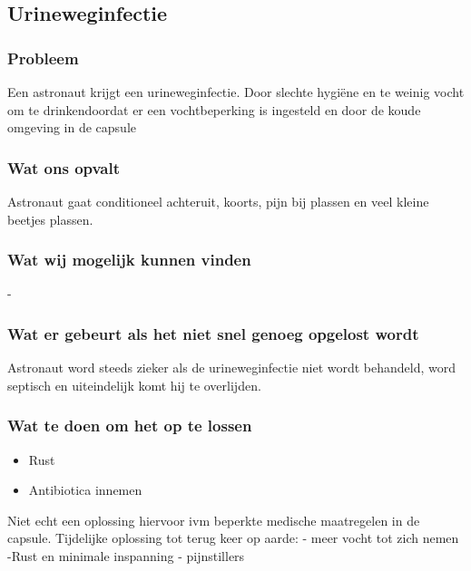 \subsection{Urineweginfectie}

\subsubsection{Probleem}
Een astronaut krijgt een urineweginfectie.
Door slechte hygiëne en te weinig vocht om te drinkendoordat er een vochtbeperking is ingesteld en door de koude omgeving in de capsule

\subsubsection{Wat ons opvalt}
Astronaut gaat conditioneel achteruit, koorts, pijn bij plassen en veel kleine beetjes plassen.

\subsubsection{Wat wij mogelijk kunnen vinden}
-

\subsubsection{Wat er gebeurt als het niet snel genoeg opgelost wordt}
Astronaut word steeds zieker als de urineweginfectie niet wordt behandeld, word septisch en uiteindelijk komt hij te overlijden.

\subsubsection{Wat te doen om het op te lossen}
\begin{itemize}
    \item Rust
    \item Antibiotica innemen
\end{itemize}
 Niet echt een oplossing hiervoor ivm beperkte medische maatregelen in de capsule.
 Tijdelijke oplossing tot terug keer op aarde: 
 - meer vocht tot zich nemen
 -Rust en minimale inspanning
 - pijnstillers